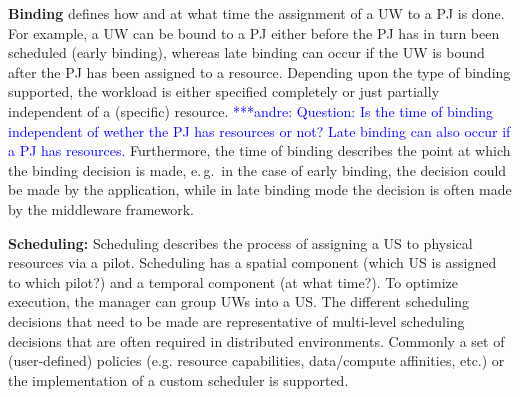 \documentclass[conference,final]{IEEEtran}
\newcommand{\jhanote}[1]{ {\textcolor{red} { ***shantenu: #1 }}}
\newcommand{\alnote}[1]{ {\textcolor{blue} { ***andre: #1 }}}
\newcommand{\alnote}[1]{}
\newcommand{\jhanote}[1]{}
\begin{document}
\textbf{Binding} defines how and at what time the assignment of a UW
to a PJ is done.  For example, a UW can be bound to a PJ either before
the PJ has in turn been scheduled (early binding), whereas late
binding can occur if the UW is bound after the PJ has been assigned to
a resource.  Depending upon the type of binding supported, the
workload is either specified completely or just partially independent of a (specific)
resource.  \alnote{Question: Is the time of binding
  independent of wether the PJ has resources or not? Late binding
  can also occur if a PJ has resources.}  Furthermore, the time of
binding describes the point at which the binding decision is made,
e.\,g.\ in the case of early binding, the decision could be made by
the application, while in late binding mode the decision is often made by
the middleware framework.



\textbf{Scheduling:} Scheduling describes the process of assigning a US to
physical resources via a pilot. Scheduling has a spatial component (which US is
assigned to which pilot?) and a temporal component (at what time?). To optimize
execution, the manager can group UWs into a US. The different scheduling
decisions that need to be made are representative of multi-level scheduling
decisions that are often required in distributed environments. Commonly a set of
(user-defined) policies (e.g. resource capabilities, data/compute affinities,
etc.) or the implementation of a custom scheduler is supported.
\end{document}
